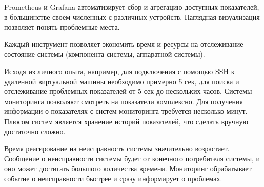 Prometheus и Grafana автоматизирует сбор и агрегацию доступных показателей, в большинстве своем численных с различных устройств. 
Наглядная визуализация позволяет понять проблемные места.

Каждый инструмент позволяет экономить время и ресурсы на отслеживание состояние системы (компонента системы, аппаратной системы).

Исходя из личного опыта, например, для подключения с помощью SSH к удаленной виртуальной машины необходимо примерно 5 сек, для поиска и отслеживание 
проблемных показателей от 5 сек до нескольких часов. Системы мониторинга позволяют смотреть на показатели комплексно. Для получения
информации о показателях с систем мониторинга требуется несколько минут. Плюсом систем является хранение историй показателей, что 
сделать вручную достаточно сложно.

Время реагирование на неисправность системы значительно возрастает. Сообщение о неисправности системы будет от конечного потребителя системы,
и оно может достигать большого количества времени. Мониторинг обрабатывает событие о неисправности быстрее и сразу информирует о проблемах.
